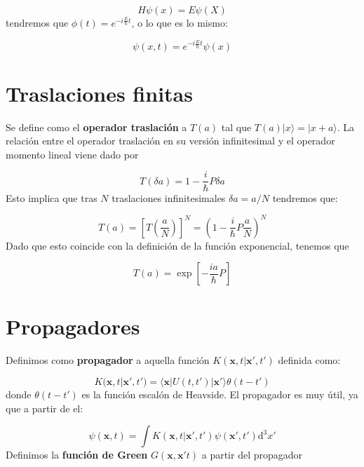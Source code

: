 \documentclass[12pt,a4paper]{book}
\numberwithin{equation}{chapter}
\numberwithin{figure}{chapter}
\newcommand{\parentesis}[1]{\left( #1  \right)}
\newcommand{\ccorchetes}[1]{\left[ #1  \right]}
\newcommand{\D}{\mathrm{d}}
\newcommand{\xn}{\mathbf{x}}
\begin{document}
\begin{equation}
H \psi (x) = E \psi (X)
\end{equation}
tendremos que $\phi(t)=e^{-i\frac{E}{\hbar}t}$, o lo que es lo mismo:

\begin{equation}
\psi(x,t) = e^{- i \frac{E}{\hbar} t} \psi(x)
\end{equation}

\section{Traslaciones finitas}

Se define como el \textbf{operador traslación} a $T(a)$ tal que $T(a)|x\rangle = |x+a\rangle$. La relación entre el operador traslación en su versión infinitesimal y el operador momento lineal viene dado por

\begin{equation}
T(\delta a) = 1 - \frac{i}{\hbar} P \delta a
\end{equation}
Esto implica que tras $N$ traslaciones infinitesimales $\delta a=a/N$ tendremos que:

\begin{equation}
T(a) = \ccorchetes{T\parentesis{\frac{a}{N}}}^N = \parentesis{1- \frac{i}{\hbar} P \frac{a}{N}}^N 
\end{equation}
Dado que esto coincide con la definición de la función exponencial, tenemos que

\begin{equation}
T(a) = \exp \ccorchetes{- \frac{ia}{\hbar}P}
\end{equation}

\section{Propagadores}

Definimos como \textbf{propagador} a aquella función $K(\xn,t|\xn',t')$  definida como:

\begin{equation}
K(\xn,t|\xn',t') = \langle \xn | U(t,t') | \xn'\rangle \theta(t-t')
\end{equation}
donde $\theta(t-t')$ es la función escalón de Heavside. El propagador es muy útil, ya que a partir de el:

\begin{equation}
\psi (\xn,t) = \int K(\xn,t|\xn',t') \psi (\xn',t') \D^3 x'
\end{equation}
Definimos la \textbf{ función de Green } $G(\xn,\xn't)$ a partir del propagador 
\end{document}
